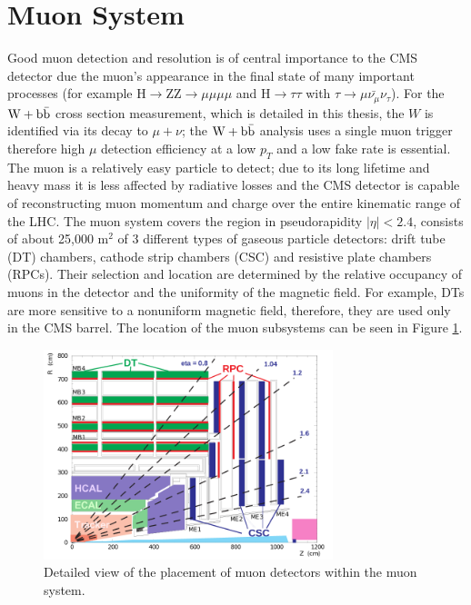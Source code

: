 \section{Muon System}
Good muon detection and resolution is of central importance 
to the CMS detector due the muon's appearance in the final state of many important processes
(for example H$\rightarrow$ZZ$\rightarrow\mu\mu\mu\mu$ and H$\rightarrow\tau\tau$ 
with $\tau\rightarrow\mu\bar{\nu_{\mu}}\nu_{\tau}$). For the $\mathrm{W+\mathrm{b\bar{b}}}$ cross section measurement,
which is detailed in this thesis, the $W$ is identified via its decay 
to $\mu+\nu$; the $\mathrm{W+\mathrm{b\bar{b}}}$ analysis
uses a single muon trigger therefore high $\mu$ detection efficiency at a low $p_{T}$ and a low fake
rate is essential. 
The muon is a relatively easy particle to detect; due to its long lifetime 
and heavy mass it is less affected by radiative losses and the
CMS detector is capable of reconstructing muon momentum and charge over the entire
kinematic range of the LHC. The muon system covers the region in pseudorapidity
$|\eta|<2.4$, consists of about 25,000 m$^{2}$ of 3
 different types of gaseous particle detectors: drift tube (DT) chambers, 
 cathode strip chambers (CSC) and resistive plate chambers (RPCs).
 Their selection and location are determined by the relative occupancy
 of muons in the detector and the uniformity of the magnetic field.
 For example, DTs are more sensitive to a nonuniform magnetic field, therefore,
 they are used only in the CMS barrel. The location of the muon subsystems
 can be seen in Figure \ref{fig:muonLayout}. 
 \begin{figure}[hb]
  \centering
	\includegraphics[width=0.75\textwidth]{images/muonSysLayout.png}
  	\caption[Layout of the Muon Sub-Detector]
   	{Detailed view of the placement of muon detectors within the muon system.}
	\label{fig:muonLayout}
\end{figure}
 
